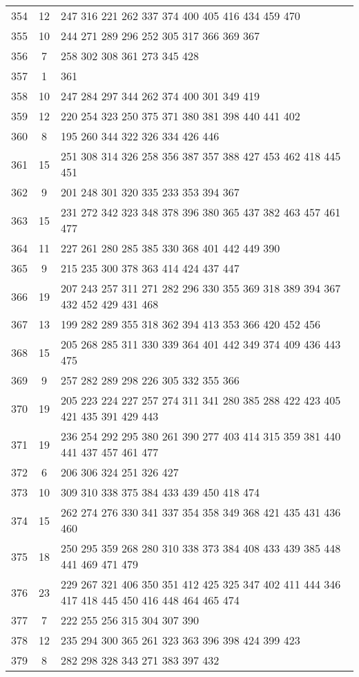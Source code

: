 \documentclass{standalone}
\begin{document}
\begin{tabular}{c c l}
354 & 12 & 247 316 221 262 337 374 400 405 416 434 459 470 \\
355 & 10 & 244 271 289 296 252 305 317 366 369 367 \\
356 & 7 & 258 302 308 361 273 345 428 \\
357 & 1 & 361 \\
358 & 10 & 247 284 297 344 262 374 400 301 349 419 \\
359 & 12 & 220 254 323 250 375 371 380 381 398 440 441 402 \\
360 & 8 & 195 260 344 322 326 334 426 446 \\
361 & 15 & 251 308 314 326 258 356 387 357 388 427 453 462 418 445 451 \\
362 & 9 & 201 248 301 320 335 233 353 394 367 \\
363 & 15 & 231 272 342 323 348 378 396 380 365 437 382 463 457 461 477 \\
364 & 11 & 227 261 280 285 385 330 368 401 442 449 390 \\
365 & 9 & 215 235 300 378 363 414 424 437 447 \\
366 & 19 & 207 243 257 311 271 282 296 330 355 369 318 389 394 367 432 452 429 431 468 \\
367 & 13 & 199 282 289 355 318 362 394 413 353 366 420 452 456 \\
368 & 15 & 205 268 285 311 330 339 364 401 442 349 374 409 436 443 475 \\
369 & 9 & 257 282 289 298 226 305 332 355 366 \\
370 & 19 & 205 223 224 227 257 274 311 341 280 385 288 422 423 405 421 435 391 429 443 \\
371 & 19 & 236 254 292 295 380 261 390 277 403 414 315 359 381 440 441 437 457 461 477 \\
372 & 6 & 206 306 324 251 326 427 \\
373 & 10 & 309 310 338 375 384 433 439 450 418 474 \\
374 & 15 & 262 274 276 330 341 337 354 358 349 368 421 435 431 436 460 \\
375 & 18 & 250 295 359 268 280 310 338 373 384 408 433 439 385 448 441 469 471 479 \\
376 & 23 & 229 267 321 406 350 351 412 425 325 347 402 411 444 346 417 418 445 450 416 448 464 465 474 \\
377 & 7 & 222 255 256 315 304 307 390 \\
378 & 12 & 235 294 300 365 261 323 363 396 398 424 399 423 \\
379 & 8 & 282 298 328 343 271 383 397 432 \\

\end{tabular}
\end{document}
